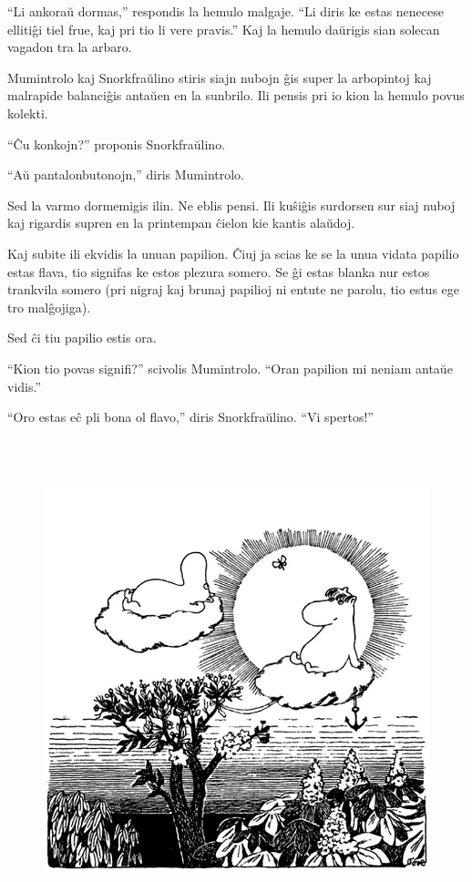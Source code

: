``Li ankoraŭ dormas,'' respondis la hemulo malgaje. ``Li diris ke estas nenecese ellitiĝi tiel frue, kaj pri tio li vere pravis.'' Kaj la hemulo daŭrigis sian solecan vagadon tra la arbaro.

Mumintrolo kaj Snorkfraŭlino stiris siajn nubojn ĝis super la arbopintoj kaj malrapide balanciĝis antaŭen en la sunbrilo. Ili pensis pri io kion la hemulo povus kolekti.

``Ĉu konkojn?'' proponis Snorkfraŭlino.

``Aŭ pantalonbutonojn,'' diris Mumintrolo.

Sed la varmo dormemigis ilin. Ne eblis pensi. Ili kuŝiĝis surdorsen sur siaj nuboj kaj rigardis supren en la printempan ĉielon kie kantis alaŭdoj.

Kaj subite ili ekvidis la unuan papilion. Ĉiuj ja scias ke se la unua vidata papilio estas flava, tio signifas ke estos plezura somero. Se ĝi estas blanka nur estos trankvila somero (pri nigraj kaj brunaj papilioj ni entute ne parolu, tio estus ege tro malĝojiga).

Sed ĉi tiu papilio estis ora.

``Kion tio povas signifi?'' scivolis Mumintrolo. ``Oran papilion mi neniam antaŭe vidis.''

``Oro estas eĉ pli bona ol flavo,'' diris Snorkfraŭlino. ``Vi spertos!''

\begin{figure}[htbp]
\centering
\includegraphics[width=400pt,height=400pt]{_7.jpg}
\caption{}
\label{_7}
\end{figure}

